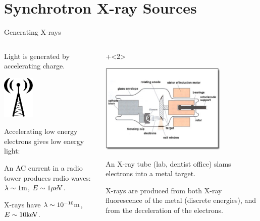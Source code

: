 \section{Synchrotron X-ray Sources}

\begin{slide}{Generating X-rays}
  
  \begin{columns}
    \begin{column}{60mm}
      
      
      Light is generated by accelerating charge.
      \vmm
      
      \hspace{12mm} \includegraphics[width=15mm]{figs/Images/radio_tower}
      
      Accelerating low energy electrons gives low energy light:
      
      \vmm

      An AC current in a radio tower produces radio waves:
      $\rm \lambda \sim 1 m$,  $E \sim \rm 1 {\mu}eV$.

      \vmm\vmm\vmm

      X-rays have
      $\rm \lambda \sim 10^{-10} m$,  $E \sim \rm 10 keV$.
      
      \end{column}
      \begin{column}{75mm}

        {\onslide+<2> {

            \hspace{5mm} \includegraphics[width=60mm]{figs/Images/XrayTube}        


          \vmm\vmm
          
          An X-ray tube (lab, dentist office) slams electrons into a metal
          target.

          \vmm\vmm
          
          X-rays are produced from both X-ray fluorescence of the metal
          (discrete energies), and from the deceleration of the electrons.
          
          
          \vspace{2mm}
        }
      }
      \end{column}
    \end{columns}          
    
    \vmm \vfill
  \end{slide}
 

